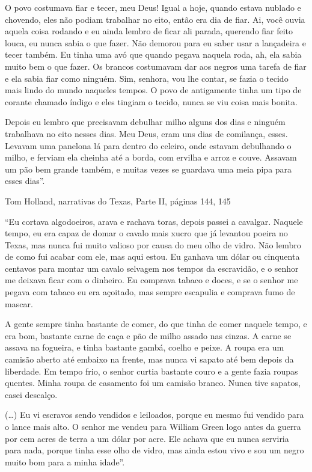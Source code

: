 O povo costumava fiar e tecer, meu Deus! Igual a hoje, quando estava
nublado e chovendo, eles não podiam trabalhar no eito, então era dia de
fiar. Ai, você ouvia aquela coisa rodando e eu ainda lembro de ficar ali
parada, querendo fiar feito louca, eu nunca sabia o que fazer. Não
demorou para eu saber usar a lançadeira e tecer também. Eu tinha uma avó
que quando pegava naquela roda, ah, ela sabia muito bem o que fazer. Os
brancos costumavam dar aos negros uma tarefa de fiar e ela sabia fiar
como ninguém. Sim, senhora, vou lhe contar, se fazia o tecido mais lindo
do mundo naqueles tempos. O povo de antigamente tinha um tipo de corante
chamado índigo e eles tingiam o tecido, nunca se viu coisa mais bonita.

Depois eu lembro que precisavam debulhar milho alguns dos dias e ninguém
trabalhava no eito nesses dias. Meu Deus, eram uns dias de comilança,
esses. Levavam uma panelona lá para dentro do celeiro, onde estavam
debulhando o milho, e ferviam ela cheinha até a borda, com ervilha e
arroz e couve. Assavam um pão bem grande também, e muitas vezes se
guardava uma meia pipa para esses dias''.

Tom Holland, narrativas do Texas, Parte II, páginas 144, 145

``Eu cortava algodoeiros, arava e rachava toras, depois passei a
cavalgar. Naquele tempo, eu era capaz de domar o cavalo mais xucro que
já levantou poeira no Texas, mas nunca fui muito valioso por causa do
meu olho de vidro. Não lembro de como fui acabar com ele, mas aqui
estou. Eu ganhava um dólar ou cinquenta centavos para montar um cavalo
selvagem nos tempos da escravidão, e o senhor me deixava ficar com o
dinheiro. Eu comprava tabaco e doces, e se o senhor me pegava com tabaco
eu era açoitado, mas sempre escapulia e comprava fumo de mascar.

A gente sempre tinha bastante de comer, do que tinha de comer naquele
tempo, e era bom, bastante carne de caça e pão de milho assado nas
cinzas. A carne se assava na fogueira, e tinha bastante gambá, coelho e
peixe. A roupa era um camisão aberto até embaixo na frente, mas nunca vi
sapato até bem depois da liberdade. Em tempo frio, o senhor curtia
bastante couro e a gente fazia roupas quentes. Minha roupa de casamento
foi um camisão branco. Nunca tive sapatos, casei descalço.

(\ldots{}) Eu vi escravos sendo vendidos e leiloados, porque eu mesmo
fui vendido para o lance mais alto. O senhor me vendeu para William
Green logo antes da guerra por cem acres de terra a um dólar por acre.
Ele achava que eu nunca serviria para nada, porque tinha esse olho de
vidro, mas ainda estou vivo e sou um negro muito bom para a minha
idade''.

